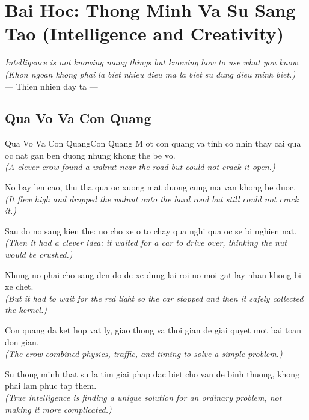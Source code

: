 \chapter{Bai Hoc: Thong Minh Va Su Sang Tao (Intelligence and Creativity)}
\begin{center}
  \textit{\color{truyenblue}Intelligence is not knowing many things but knowing how to use what you know.}\\
  \textit{(Khon ngoan khong phai la biet nhieu dieu ma la biet su dung dieu minh biet.)}\\[4pt]
  \small\color{truyengold}--- Thien nhien day ta ---
\end{center}
\ngancach

\section{Qua Vo Va Con Quang}
\begin{truyen}{Qua Vo Va Con Quang}{Con Quang}
M ot con quang va tinh co nhin thay cai qua oc nat gan ben duong nhung khong the be vo.\\
\textit{(A clever crow found a walnut near the road but could not crack it open.)}

No bay len cao, thu tha qua oc xuong mat duong cung ma van khong be duoc.\\
\textit{(It flew high and dropped the walnut onto the hard road but still could not crack it.)}

Sau do no sang kien the: no cho xe o to chay qua nghi qua oc se bi nghien nat.\\
\textit{(Then it had a clever idea: it waited for a car to drive over, thinking the nut would be crushed.)}

Nhung no phai cho sang den do de xe dung lai roi no moi gat lay nhan khong bi xe chet.\\
\textit{(But it had to wait for the red light so the car stopped and then it safely collected the kernel.)}

Con quang da ket hop vat ly, giao thong va thoi gian de giai quyet mot bai toan don gian.\\
\textit{(The crow combined physics, traffic, and timing to solve a simple problem.)}

\end{truyen}
\begin{baihoc}
  Su thong minh that su la tim giai phap dac biet cho van de binh thuong, khong phai lam phuc tap them.\\
  \textit{(True intelligence is finding a unique solution for an ordinary problem, not making it more complicated.)}
\end{baihoc}

